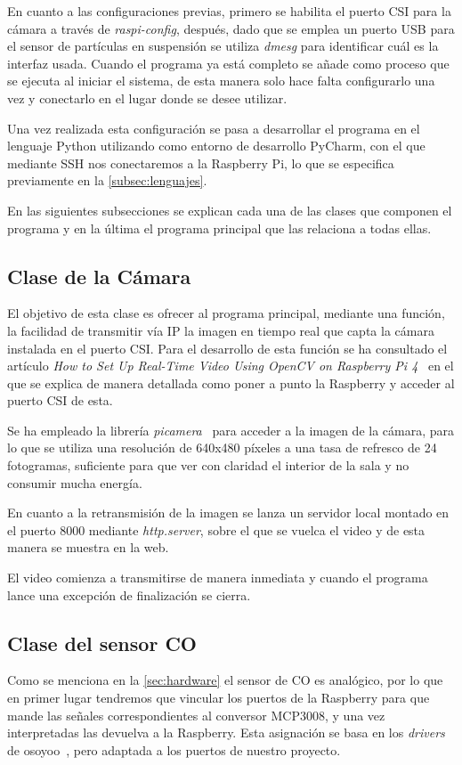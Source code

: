 En cuanto a las configuraciones previas, primero se habilita el puerto CSI para la cámara a través de \textit{raspi-config}, después, dado que se emplea un puerto USB para el sensor de partículas en suspensión se utiliza \textit{dmesg} para identificar cuál es la interfaz usada. Cuando el programa ya está completo se añade como proceso que se ejecuta al iniciar el sistema, de esta manera solo hace falta configurarlo una vez y conectarlo en el lugar donde se desee utilizar.
\pagebreak

Una vez realizada esta configuración se pasa a desarrollar el programa en el lenguaje Python utilizando como entorno de desarrollo PyCharm, con el que mediante SSH nos conectaremos a la Raspberry Pi, lo que se especifica previamente en la \autoref{subsec:lenguajes}.

En las siguientes subsecciones se explican cada una de las clases que componen el programa y en la última el programa principal que las relaciona a todas ellas.

\subsection{Clase de la Cámara}\label{subsec:clase-de-la-cámara}
El objetivo de esta clase es ofrecer al programa principal, mediante una función, la facilidad de transmitir vía IP la imagen en tiempo real que capta la cámara instalada en el puerto CSI. Para el desarrollo de esta función se ha consultado el artículo \textit{How to Set Up Real-Time Video Using OpenCV on Raspberry Pi 4}~\cite{addison_how_nodate} en el que se explica de manera detallada como poner a punto la Raspberry y acceder al puerto CSI de esta.

Se ha empleado la librería \textit{picamera}~\cite{jones_picamera_nodate} para acceder a la imagen de la cámara, para lo que se utiliza una resolución de 640x480 píxeles a una tasa de refresco de 24 fotogramas, suficiente para que ver con claridad el interior de la sala y no consumir mucha energía.

En cuanto a la retransmisión de la imagen se lanza un servidor local montado en el puerto 8000 mediante \textit{http.server}, sobre el que se vuelca el video y de esta manera se muestra en la web.

El video comienza a transmitirse de manera inmediata y cuando el programa lance una excepción de finalización se cierra.

\subsection{Clase del sensor CO}\label{subsec:clase-del-sensor-co}
Como se menciona en la \autoref{sec:hardware} el sensor de CO es analógico, por lo que en primer lugar tendremos que vincular los puertos de la Raspberry para que mande las señales correspondientes al conversor MCP3008, y una vez interpretadas las devuelva a la Raspberry. Esta asignación se basa en los \textit{drivers} de osoyoo~\cite{osoyoo_osoyoodriver_2021}, pero adaptada a los puertos de nuestro proyecto.

